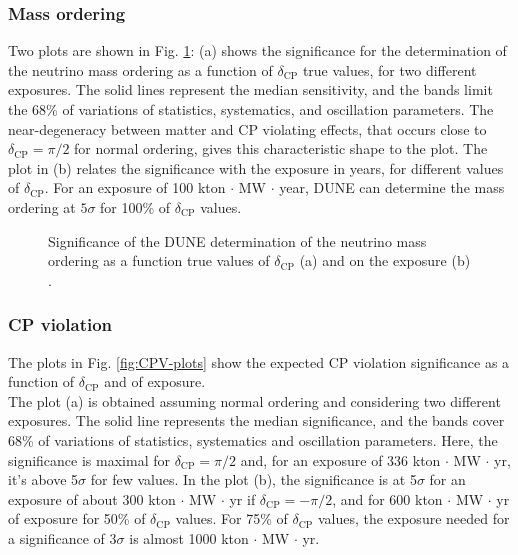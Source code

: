 \subsubsection{Mass ordering}
 Two plots are shown in Fig. \ref{fig:MO-plots}: (a) shows the significance for the determination of the neutrino mass ordering as a function of $\delta_{\text{CP}}$ true values, for two different exposures. The solid lines represent the median sensitivity, and the bands limit the 68\% of variations of statistics, systematics, and oscillation parameters. The near-degeneracy between matter and CP violating effects, that occurs close to $\delta_{\text{CP}} = \pi/2$ for normal ordering, gives this characteristic shape to the plot.
The plot in (b) relates the significance with the exposure in years, for different values of $\delta_{\text{CP}}$. For an exposure of 100 kton $\cdot$ MW $\cdot$ year, DUNE can determine the mass ordering at $5\sigma$ for 100\% of $\delta_{\text{CP}}$ values.

\begin{figure}
    \centering
    \hfil
    \caption{Significance of the DUNE determination of the neutrino mass ordering as a function true values of $\delta_{\text{CP}}$ (a) and on the exposure (b) \cite{dunecollaboration2022snowmass}.}
    \label{fig:MO-plots}
\end{figure}

\subsubsection{CP violation}
The plots in Fig. \ref{fig:CPV-plots} show the expected CP violation significance as a function of $\delta_{\text{CP}}$ and of exposure.\\
The plot (a) is obtained assuming normal ordering and considering two different exposures. The solid line represents the median significance, and the bands cover 68\% of variations of statistics, systematics and oscillation parameters. Here, the significance is maximal for $\delta_{\text{CP}} = \pi/2$ and, for an exposure of 336 kton $\cdot$ MW $\cdot$ yr, it's above 5$\sigma$ for few values.
In the plot (b), the significance is at 5$\sigma$ for an exposure of about 300 kton $\cdot$ MW $\cdot$ yr if $\delta_{\text{CP}} = -\pi/2$, and for 600 kton $\cdot$ MW $\cdot$ yr of exposure for 50\% of $\delta_{\text{CP}}$ values. For 75\% of $\delta_{\text{CP}}$ values, the exposure needed for a significance of 3$\sigma$ is almost 1000 kton $\cdot$ MW $\cdot$ yr. 

